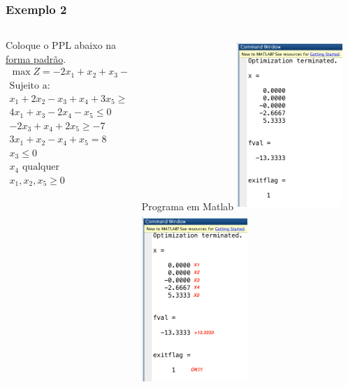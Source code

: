 \begin{frame}
	\frametitle{Exemplo 2}
	\begin{columns}
		\begin{column}{0.5\textwidth}
		\begin{block}{Coloque o PPL abaixo na \underline{forma padrão}.}
			\begin{equation*}
				\begin{matrix}
					\scriptstyle \max Z = -2x_1+x_2+x_3-3x_4+x_5 \\
					\scriptstyle \text{Sujeito a:} \\
					\scriptstyle x_1+2x_2-x_3+x_4+3x_5 \ge 5 \\
					\scriptstyle 4x_1+x_3-2x_4-x_5 \le 0 \\
					\scriptstyle -2x_3+x_4+2x_5\ge -7 \\
					\scriptstyle 3x_1+x_2-x_4+x_5 = 8 \\
					\scriptstyle x_3 \le 0 \\
					\scriptstyle x_4 \text{ qualquer} \\
					\scriptstyle x_1, x_2, x_5 \ge 0 \\
				\end{matrix}
			\end{equation*}
		\end{block}
		\end{column}
		\begin{column}{0.5\textwidth}
			\begin{block}{Programa em Matlab}
				\only<1>
				{
					\includegraphics[width=4cm,height=6.5cm]{Exemplo2a.png}
				}
				\only<2>
				{
					\includegraphics[width=4cm,height=6.5cm]{Exemplo2aLINHA.png}
				}
			\end{block}
		\end{column}
	\end{columns}
\end{frame}

